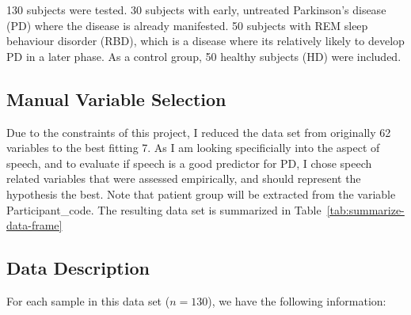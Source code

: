 \documentclass[
  english,
  doc,floatsintext]{apa6}
\begin{document}
130 subjects were tested. 30 subjects with early, untreated Parkinson's disease (PD) where the disease is already manifested. 50 subjects with REM sleep behaviour disorder (RBD), which is a disease where its relatively likely to develop PD in a later phase. As a control group, 50 healthy subjects (HD) were included.

\hypertarget{manual-variable-selection}{%
\subsection{Manual Variable Selection}\label{manual-variable-selection}}

Due to the constraints of this project, I reduced the data set from originally 62 variables to the best fitting 7. As I am looking specificially into the aspect of speech, and to evaluate if speech is a good predictor for PD, I chose speech related variables that were assessed empirically, and should represent the hypothesis the best. Note that patient group will be extracted from the variable Participant\_code. The resulting data set is summarized in Table~\ref{tab:summarize-data-frame}

\hypertarget{data-description}{%
\subsection{Data Description}\label{data-description}}

For each sample in this data set (\(n=130\)), we have the following information:
\end{document}
